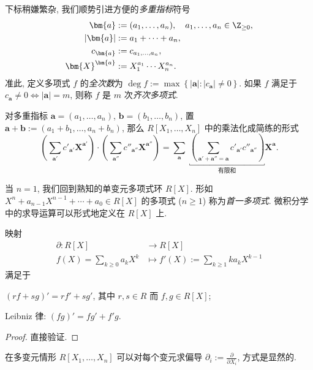 下标稍嫌繁杂, 我们顺势引进方便的\emph{多重指标}符号
\begin{align*}
	\bm{a} & := (a_1, \ldots, a_n), \quad a_1, \ldots, a_n \in \Z_{\geq 0}, \\
	|\bm{a}| & := a_1 + \cdots + a_n, \\
	c_{\bm{a}} & := c_{a_1, \ldots, a_n}, \\
	\bm{X}^{\bm{a}} & := X_1^{a_1} \cdots X_n^{a_n}.
\end{align*}
准此, 定义多项式 $f$ 的\emph{全次数}为 $\deg f := \max\left\{ |\bm{a}| : |c_{\bm{a}}|\neq 0 \right\}$. 如果 $f$ 满足于 $c_{\bm{a}} \neq 0 \iff |\bm{a}|=m$, 则称 $f$ 是 $m$ 次\emph{齐次多项式}.

对多重指标 $\bm{a} = (a_1, \ldots, a_n)$, $\bm{b} = (b_1, \ldots, b_n)$, 置 $\bm{a} + \bm{b} := (a_1 + b_1, \ldots, a_n + b_n)$, 那么 $R[X_1, \ldots, X_n]$ 中的乘法化成简练的形式
\begin{equation}\label{eqn:polynomial-multiplication}
	\left( \sum_{\bm{a}'} c'_{\bm{a}'} \bm{X}^{\bm{a}'} \right) \cdot \left( \sum_{\bm{a}''} c''_{\bm{a}''} \bm{X}^{\bm{a}''} \right) = \sum_{\bm{a}} \; \underbracket{ \left( \sum_{\bm{a}' + \bm{a}'' = \bm{a}} c'_{\bm{a}'} c''_{\bm{a}''} \right) }_{\text{有限和}} \bm{X}^{\bm{a}}.
\end{equation}

当 $n=1$, 我们回到熟知的单变元多项式环 $R[X]$. 形如 $X^n + a_{n-1} X^{n-1} + \cdots + a_0 \in R[X]$ 的多项式 ($n \geq 1$) 称为\emph{首一多项式}. 微积分学中的求导运算可以形式地定义在 $R[X]$ 上. 
\begin{proposition}\label{prop:polynomial-derivation}
	映射
	\begin{align*}
		\partial: R[X] & \longrightarrow R[X] \\
		f(X) = \sum_{k \geq 0} a_k X^k & \longmapsto f'(X) := \sum_{k \geq 1} k a_k X^{k-1}
	\end{align*}
	满足于
	\begin{compactitem}
		\item $(rf + sg)' = rf' + sg'$, 其中 $r, s \in R$ 而 $f, g \in R[X]$;
		\item Leibniz 律: $(fg)' = fg' + f'g$.
	\end{compactitem}
\end{proposition}
\begin{proof}
	直接验证.
\end{proof}
在多变元情形 $R[X_1, \ldots, X_n]$ 可以对每个变元求偏导 $\partial_i := \frac{\partial}{\partial X_i}$, 方式是显然的.

